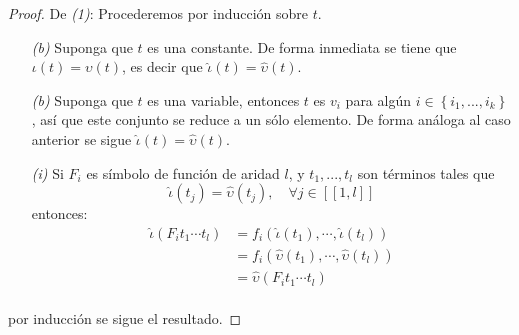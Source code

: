 \documentclass[12pt]{report}
\newcounter{it}
\theoremstyle{largebreak}
\newcommand\natint[1]{\ensuremath{\left[\!\left[ #1\right]\!\right]}}
\begin{document}
    \begin{proof}
        De \textit{(1)}: Procederemos por inducción sobre $t$.
        \begin{itemize}
            \item[\textit{(b)}] Suponga que $t$ es una constante. De forma inmediata se tiene que $\iota(t)=\upsilon(t)$, es decir que $\hat{\iota}(t)=\hat{\upsilon}(t)$.
            \item[\textit{(b)}] Suponga que $t$ es una variable, entonces $t$ es $v_i$ para algún $i\in\left\{i_1,...,i_k \right\}$, así que este conjunto se reduce a un sólo elemento. De forma análoga al caso anterior se sigue $\hat{\iota}(t)=\hat{\upsilon}(t)$.
            \item[\textit{(i)}] Si $F_i$ es símbolo de función de aridad $l$, y $t_1,...,t_l$ son términos tales que
            \begin{equation*}
                \hat{\iota}(t_j)=\hat{\upsilon}(t_j),\quad\forall j\in\natint{1,l}
            \end{equation*}
            entonces:
            \begin{equation*}
                \begin{split}
                    \hat{\iota}\left(F_it_1\cdots t_l\right)&=f_i\left(\hat{\iota}(t_1),\cdots,\hat{\iota}(t_l) \right)\\
                    &=f_i\left(\hat{\upsilon}(t_1),\cdots,\hat{\upsilon}(t_l) \right)\\
                    &=\hat{\upsilon}\left(F_it_1\cdots t_l\right)\\
                \end{split}
            \end{equation*}
        \end{itemize}
        por inducción se sigue el resultado.
        

\end{proof}
\end{document}
